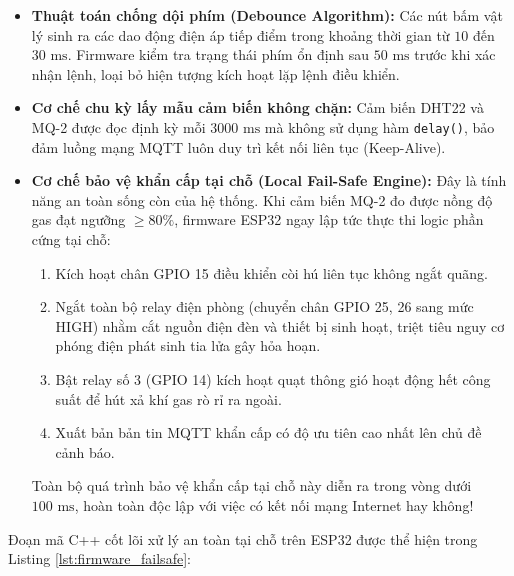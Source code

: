 \begin{itemize}
    \item \textbf{Thuật toán chống dội phím (Debounce Algorithm):} Các nút bấm vật lý sinh ra các dao động điện áp tiếp điểm trong khoảng thời gian từ $10$ đến $30\text{ ms}$. Firmware kiểm tra trạng thái phím ổn định sau $50\text{ ms}$ trước khi xác nhận lệnh, loại bỏ hiện tượng kích hoạt lặp lệnh điều khiển.
    \item \textbf{Cơ chế chu kỳ lấy mẫu cảm biến không chặn:} Cảm biến DHT22 và MQ-2 được đọc định kỳ mỗi $3000\text{ ms}$ mà không sử dụng hàm \texttt{delay()}, bảo đảm luồng mạng MQTT luôn duy trì kết nối liên tục (Keep-Alive).
    \item \textbf{Cơ chế bảo vệ khẩn cấp tại chỗ (Local Fail-Safe Engine):} Đây là tính năng an toàn sống còn của hệ thống. Khi cảm biến MQ-2 đo được nồng độ gas đạt ngưỡng $\ge 80\%$, firmware ESP32 ngay lập tức thực thi logic phần cứng tại chỗ:
    \begin{enumerate}
        \item Kích hoạt chân GPIO 15 điều khiển còi hú liên tục không ngắt quãng.
        \item Ngắt toàn bộ relay điện phòng (chuyển chân GPIO 25, 26 sang mức HIGH) nhằm cắt nguồn điện đèn và thiết bị sinh hoạt, triệt tiêu nguy cơ phóng điện phát sinh tia lửa gây hỏa hoạn.
        \item Bật relay số 3 (GPIO 14) kích hoạt quạt thông gió hoạt động hết công suất để hút xả khí gas rò rỉ ra ngoài.
        \item Xuất bản bản tin MQTT khẩn cấp có độ ưu tiên cao nhất lên chủ đề cảnh báo.
    \end{enumerate}
    Toàn bộ quá trình bảo vệ khẩn cấp tại chỗ này diễn ra trong vòng dưới $100\text{ ms}$, hoàn toàn độc lập với việc có kết nối mạng Internet hay không!
\end{itemize}

Đoạn mã C++ cốt lõi xử lý an toàn tại chỗ trên ESP32 được thể hiện trong Listing \ref{lst:firmware_failsafe}:

